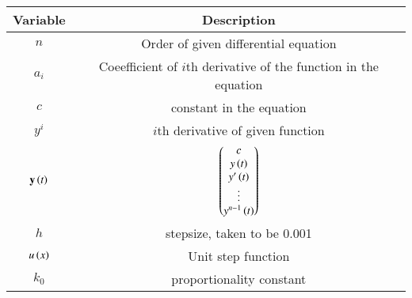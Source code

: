 \begin{tabular}[12pt]{ |c| c|}
    \hline
    \textbf{Variable} & \textbf{Description}\\
    \hline
    $n$ & Order of given differential equation\\
    \hline
    $a_i$ & Coeefficient of $i$th derivative of the function in the equation\\
    \hline
    $c$ & constant in the equation\\
    \hline
    $y^i$ & $i$th derivative of given function\\
    \hline
    $\mathbf{y}\left(t\right)$ & $\begin{pmatrix}c \\ y\left(t\right) \\ y^\prime\left(t\right) \\ \vdots \\ y^{n-1}\left(t\right)\end{pmatrix}$\\
    \hline
    $h$ & stepsize, taken to be 0.001\\
    \hline
    $u\left(x\right)$ & Unit step function\\
    \hline
    $k_0$ & proportionality constant\\
    \hline
    \end{tabular}
